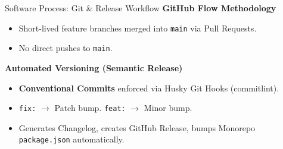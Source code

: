\documentclass[aspectratio=169]{beamer}
\begin{document}
\begin{frame}{Software Process: Git \& Release Workflow}
    \textbf{GitHub Flow Methodology}
    \vspace{0.3cm}
    \begin{itemize}
        \item Short-lived feature branches merged into \texttt{main} via Pull Requests.
        \item No direct pushes to \texttt{main}.
    \end{itemize}
    \vspace{0.3cm}
    \textbf{Automated Versioning (Semantic Release)}
    \begin{itemize}
        \item \textbf{Conventional Commits} enforced via Husky Git Hooks (commitlint).
        \item \texttt{fix:} $\rightarrow$ Patch bump. \texttt{feat:} $\rightarrow$ Minor bump.
        \item Generates Changelog, creates GitHub Release, bumps Monorepo \texttt{package.json} automatically.
    \end{itemize}
\end{frame}
\end{document}

